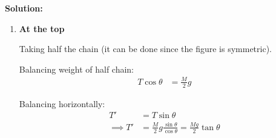 \documentclass{article}
\theoremstyle{definition}
\newenvironment{solution}
  {\par\vspace{0.5em}\noindent\textbf{Solution:}\par\nopagebreak\vspace{0.3em}}
  {\par\vspace{1em}}
\begin{document}
\begin{solution}
    \begin{enumerate}
        \item[\textbf{(a)}] \textbf{At the top}

        \noindent
        \begin{minipage}[t]{0.62\textwidth}
            \vspace{0pt}
            Taking half the chain (it can be done since the figure is symmetric).

            Balancing weight of half chain:
            \begin{align*}
                T \cos \theta &= \frac{M}{2} g
            \end{align*}

            Balancing horizontally:
            \begin{align*}
                T' &= T \sin \theta \\
                \implies T' &= \frac{M}{2} g \frac{\sin \theta}{\cos \theta} = \frac{Mg}{2} \tan \theta
            \end{align*}
        \end{minipage}%
        \hfill
        \begin{minipage}[t]{0.32\textwidth}
            \vspace{0pt}
            \centering
        \end{minipage}


\end{enumerate}
\end{solution}
\end{document}

